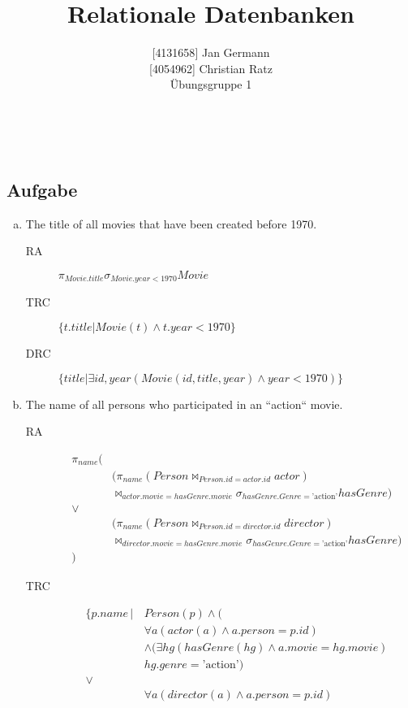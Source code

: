 \documentclass[11pt,a4paper,DIV=9]{scrartcl}
\author{{[}4131658{]} Jan Germann \\{[}4054962{]} Christian Ratz\\Übungsgruppe 1}
\title{Relationale Datenbanken}
\newcounter{temp}
\newcommand{\aufgabe}[1]{
  \setcounter{temp}{\value{subsection}}
  \setcounter{subsection}{#1}
  \addtocounter{subsection}{-1}
  \subsection{Aufgabe}
  \setcounter{subsection}{\value{temp}}
}
\renewcommand{\author}[1]{\renewcommand{\author}{#1}}
\renewcommand{\title}[1]{\renewcommand{\title}{#1}}
\newcommand{\makehomeworktitle}{
  \begin{minipage}[t]{6.5cm}
    \sf{\author}
  \end{minipage}
  \begin{minipage}[t]{6.5cm}
    \begin{flushright}
      \sf{\title\\\today}
    \end{flushright}
  \end{minipage}
  \\[0.2cm]
  \begin{center}
    \sf{
      \color{blue}{
        \LARGE{Aufgabenblatt \blattnr}
      }
    }
  \end{center}
  \vspace{0.1cm}
}
\begin{document}
\makehomeworktitle
\aufgabe{1}
  \begin{enumerate}[a)]
    \item The title of all movies that have been created before 1970.\hfill\\
      \begin{description}
        \item [RA]  $\pi_{Movie.title}\sigma_{Movie.year < 1970}Movie$
        \item [TRC] $ \{ t.title | Movie(t) \wedge t.year < 1970  \}$
        \item [DRC] $ \{ title | \exists id,year (Movie(id,title, year) \wedge year < 1970 )\}$
      \end{description}
    \item The name of all persons who participated in an ``action`` movie. \hfill\\
      \begin{description}
       \item [RA]  \begin{align*}
                        \pi_{name} (&\\
                            &(\pi_{name}(Person\Join_{Person.id = actor.id}actor)\\
                            &\Join_{actor.movie = hasGenre.movie}\sigma_{hasGenre.Genre=\textrm{'action'}}hasGenre)\\
                         \vee &\\
                            &(\pi_{name}(Person\Join_{Person.id = director.id}director)\\
                            &\Join_{director.movie = hasGenre.movie}\sigma_{hasGenre.Genre=\textrm{'action'}}hasGenre)\\
                        )
                      \end{align*}
        \item [TRC] \begin{align*}
                    \{ p.name\,|\,& Person(p) \wedge ( \\
                        &\forall a (actor(a) \wedge a.person = p.id) \\
                        &\wedge ( \exists hg ( hasGenre(hg) \wedge a.movie=hg.movie) \\
                        &  hg.genre = \textrm{'action'}) \\
                        \vee & \\
                        &\forall a (director(a) \wedge a.person = p.id) \\

\end{align*}
\end{description}
\end{enumerate}
\end{document}
